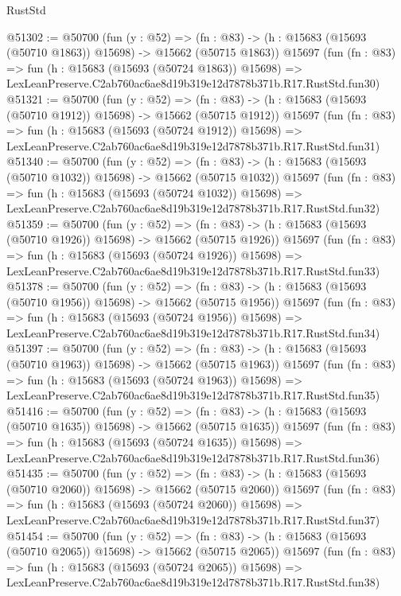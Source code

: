 \begin{lexlean}{RustStd}
\begin{coremodule}
@51302 := @50700
    (fun (y : @52) =>
    (fn : @83) -> (h : @15683 (@15693 (@50710 @1863)) @15698) -> @15662 (@50715 @1863))
    @15697
    (fun (fn : @83) =>
    fun (h : @15683 (@15693 (@50724 @1863)) @15698) =>
    LexLeanPreserve.C2ab760ac6ae8d19b319e12d7878b371b.R17.RustStd.fun30)
@51321 := @50700
    (fun (y : @52) =>
    (fn : @83) -> (h : @15683 (@15693 (@50710 @1912)) @15698) -> @15662 (@50715 @1912))
    @15697
    (fun (fn : @83) =>
    fun (h : @15683 (@15693 (@50724 @1912)) @15698) =>
    LexLeanPreserve.C2ab760ac6ae8d19b319e12d7878b371b.R17.RustStd.fun31)
@51340 := @50700
    (fun (y : @52) =>
    (fn : @83) -> (h : @15683 (@15693 (@50710 @1032)) @15698) -> @15662 (@50715 @1032))
    @15697
    (fun (fn : @83) =>
    fun (h : @15683 (@15693 (@50724 @1032)) @15698) =>
    LexLeanPreserve.C2ab760ac6ae8d19b319e12d7878b371b.R17.RustStd.fun32)
@51359 := @50700
    (fun (y : @52) =>
    (fn : @83) -> (h : @15683 (@15693 (@50710 @1926)) @15698) -> @15662 (@50715 @1926))
    @15697
    (fun (fn : @83) =>
    fun (h : @15683 (@15693 (@50724 @1926)) @15698) =>
    LexLeanPreserve.C2ab760ac6ae8d19b319e12d7878b371b.R17.RustStd.fun33)
@51378 := @50700
    (fun (y : @52) =>
    (fn : @83) -> (h : @15683 (@15693 (@50710 @1956)) @15698) -> @15662 (@50715 @1956))
    @15697
    (fun (fn : @83) =>
    fun (h : @15683 (@15693 (@50724 @1956)) @15698) =>
    LexLeanPreserve.C2ab760ac6ae8d19b319e12d7878b371b.R17.RustStd.fun34)
@51397 := @50700
    (fun (y : @52) =>
    (fn : @83) -> (h : @15683 (@15693 (@50710 @1963)) @15698) -> @15662 (@50715 @1963))
    @15697
    (fun (fn : @83) =>
    fun (h : @15683 (@15693 (@50724 @1963)) @15698) =>
    LexLeanPreserve.C2ab760ac6ae8d19b319e12d7878b371b.R17.RustStd.fun35)
@51416 := @50700
    (fun (y : @52) =>
    (fn : @83) -> (h : @15683 (@15693 (@50710 @1635)) @15698) -> @15662 (@50715 @1635))
    @15697
    (fun (fn : @83) =>
    fun (h : @15683 (@15693 (@50724 @1635)) @15698) =>
    LexLeanPreserve.C2ab760ac6ae8d19b319e12d7878b371b.R17.RustStd.fun36)
@51435 := @50700
    (fun (y : @52) =>
    (fn : @83) -> (h : @15683 (@15693 (@50710 @2060)) @15698) -> @15662 (@50715 @2060))
    @15697
    (fun (fn : @83) =>
    fun (h : @15683 (@15693 (@50724 @2060)) @15698) =>
    LexLeanPreserve.C2ab760ac6ae8d19b319e12d7878b371b.R17.RustStd.fun37)
@51454 := @50700
    (fun (y : @52) =>
    (fn : @83) -> (h : @15683 (@15693 (@50710 @2065)) @15698) -> @15662 (@50715 @2065))
    @15697
    (fun (fn : @83) =>
    fun (h : @15683 (@15693 (@50724 @2065)) @15698) =>
    LexLeanPreserve.C2ab760ac6ae8d19b319e12d7878b371b.R17.RustStd.fun38)

\end{coremodule}
\end{lexlean}
